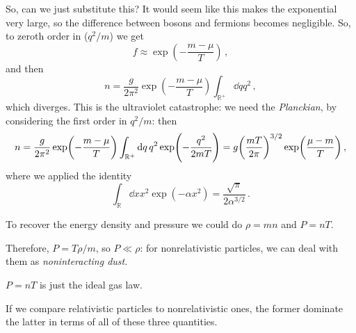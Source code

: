 \documentclass[main.tex]{subfiles}
\begin{document}
So, can we just substitute this? It would seem like this makes the exponential very large, so the difference between bosons and fermions becomes negligible. So, to zeroth order in (\(q^2/m\)) we get 
%
\begin{equation}
  f \approx \exp(-\frac{m- \mu }{T}) 
\,,
\end{equation}
%
and then 
%
\begin{equation}
  n = \frac{g}{2 \pi^2} \exp(-\frac{m- \mu }{T}) \int _{\mathbb{R}^{+}} \dd{q}q^2 
\,,
\end{equation}
%
which diverges. This is the ultraviolet catastrophe: we need the \emph{Planckian}, by considering the first order in \(q^2/m\): then
%
\begin{equation}
    n = \frac{g}{2 \pi^2} \exp(-\frac{m- \mu }{T}) \int _{\mathbb{R}^{+}} \dd{q}q^2 \exp(-\frac{q^2}{2mT}) 
    = g \qty(\frac{mT}{2 \pi })^{3/2} \exp(\frac{\mu - m}{T}) 
  \,,
\end{equation}
where we applied the identity 
%
\begin{equation}
  \int _{\mathbb{R}} \dd{x} x^2 \exp(-\alpha x^2) = \frac{\sqrt{\pi } }{2 \alpha^{3/2}} 
\,.
\end{equation}
%

To recover the energy density and pressure we could do \(\rho = m n\) and \(P = n T\). 


Therefore, \(P = T \rho / m\), so \(P \ll \rho \): for nonrelativistic particles, we can deal with them as \emph{noninteracting dust}.

\(P = nT\) is just the ideal gas law.

If we compare relativistic particles to nonrelativistic ones, the former dominate the latter in terms of all of these three quantities.
\end{document}
